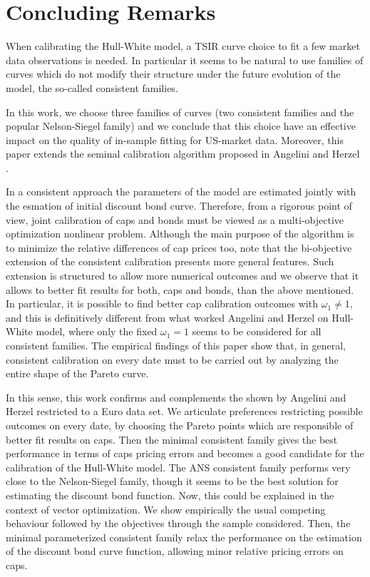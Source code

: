 \section{Concluding Remarks}
When calibrating the Hull-White model, a TSIR curve choice to fit a
few market data observations is needed. In particular it seems to be
natural to use families of curves which do not modify their structure
under the future evolution of the model, the so-called consistent
families.
 
In this work, we choose three families of curves (two consistent
families and the popular Nelson-Siegel family) and we conclude that
this choice have an effective impact on the quality of in-sample
fitting for US-market data.  Moreover, this paper extends the seminal
calibration algorithm proposed in Angelini and Herzel \cite{AH:2002}.  

In a consistent approach the parameters of the model are
estimated jointly with the esmation of initial discount bond
curve. Therefore, from a rigorous point of view, joint calibration of 
caps and bonds must be viewed as a multi-objective optimization
nonlinear problem. Although the main purpose of the algorithm is to
minimize the relative differences of cap prices too, note that the 
bi-objective extension of the consistent calibration presents more
general features. Such extension is structured to allow more numerical
outcomes and we observe that it allows to better fit results for both,
caps and bonds, than the above mentioned. In particular, it is
possible to find better cap calibration outcomes with $\omega_1\neq
1$, and this is definitively different from what worked Angelini and
Herzel \cite{AH:2002} on Hull-White model, where only the fixed
$\omega_1=1$ seems to be considered for all consistent families. The
empirical findings of this paper show that, in general, consistent
calibration on every date must to be carried out by analyzing the
entire shape of the Pareto curve. 

 In this sense, this work confirms and complements the shown by
 Angelini and Herzel \cite{AH:2002,AH:2005} restricted to a Euro data
 set. We articulate preferences restricting possible outcomes on every
 date, by choosing the Pareto points which are responsible of better
 fit results on caps. Then the minimal consistent family gives the
 best performance in terms of caps pricing errors and becomes a good
 candidate for the calibration of the Hull-White model. The ANS
 consistent family performs very close to the Nelson-Siegel family,
 though it seems to be the best solution for estimating the discount
 bond function. Now, this could be explained in the context of vector
 optimization. We show empirically the usual competing behaviour
 followed by the objectives through the sample considered. Then, the
 minimal parameterized consistent family relax the performance on the
 estimation of the discount bond curve function, allowing minor
 relative pricing errors on caps.   

